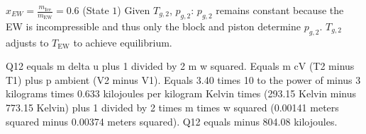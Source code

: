 \( x_{EW} = \frac{m_{\text{Ice}}}{m_{\text{EW}}} = 0.6 \) (State \( 1 \))  
Given \( T_{g,2} \), \( p_{g,2} \):  
\( p_{g,2} \) remains constant because the EW is incompressible and thus only the block and piston determine \( p_{g,2} \).  
\( T_{g,2} \) adjusts to \( T_{\text{EW}} \) to achieve equilibrium.

Q12 equals m delta u plus 1 divided by 2 m w squared.  
Equals m cV (T2 minus T1) plus p ambient (V2 minus V1).  
Equals 3.40 times 10 to the power of minus 3 kilograms times 0.633 kilojoules per kilogram Kelvin times (293.15 Kelvin minus 773.15 Kelvin) plus 1 divided by 2 times m times w squared (0.00141 meters squared minus 0.00374 meters squared).  
Q12 equals minus 804.08 kilojoules.
